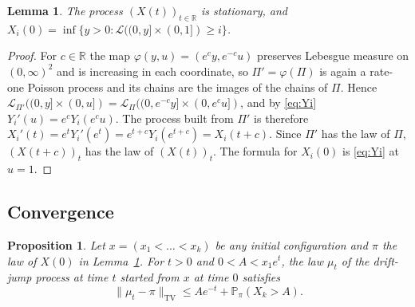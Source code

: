 \documentclass[11pt]{amsart}
\newtheorem{lemma}[theorem]{Lemma}
\newtheorem{proposition}[theorem]{Proposition}
\theoremstyle{remark}
\numberwithin{equation}{section}
\newcommand{\Pp}{\mathbb P}
\begin{document}
\begin{lemma}\label{lem:stat}
The process $(X(t))_{t\in\mathbb R}$ is stationary, and $X_i(0)=\inf\{y>0:\mathcal L((0,y]\times(0,1])\ge i\}$.
\end{lemma}

\begin{proof}
For $c\in\mathbb R$ the map $\varphi(y,u)=(e^{c}y,e^{-c}u)$ preserves Lebesgue measure on $(0,\infty)^2$ and is increasing in each coordinate, so $\Pi'=\varphi(\Pi)$ is again a rate-one Poisson process and its chains are the images of the chains of $\Pi$. Hence $\mathcal L_{\Pi'}((0,y]\times(0,u])=\mathcal L_{\Pi}((0,e^{-c}y]\times(0,e^{c}u])$, and by \eqref{eq:Yi} $Y_i'(u)=e^cY_i(e^cu)$. The process built from $\Pi'$ is therefore $X_i'(t)=e^tY_i'(e^t)=e^{t+c}Y_i(e^{t+c})=X_i(t+c)$. Since $\Pi'$ has the law of $\Pi$, $(X(t+c))_t$ has the law of $(X(t))_t$. The formula for $X_i(0)$ is \eqref{eq:Yi} at $u=1$.
\end{proof}

\subsection{Convergence}
\begin{proposition}\label{prop:conv}
Let $x=(x_1<\dots<x_k)$ be any initial configuration and $\pi$ the law of $X(0)$ in Lemma~\ref{lem:stat}. For $t>0$ and $0<A<x_1e^{t}$, the law $\mu_t$ of the drift-jump process at time $t$ started from $x$ at time $0$ satisfies
\[
\|\mu_t-\pi\|_{\mathrm{TV}}\le Ae^{-t}+\Pp_\pi(X_k>A).
\]
\end{proposition}
\end{document}
